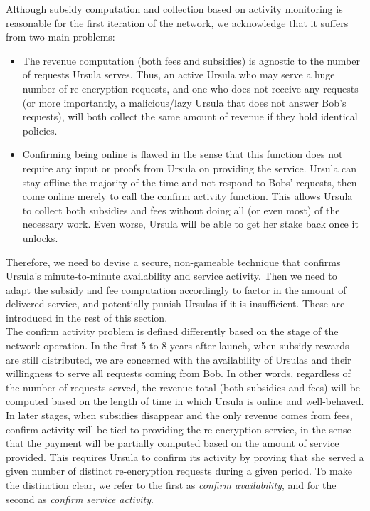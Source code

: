 \documentclass{llncs}
\begin{document}
Although subsidy computation and collection based on activity monitoring is reasonable for the first iteration of the network, we acknowledge that it suffers from two main problems:
\begin{itemize}
\setlength{\itemsep}{0pt}
\item The revenue computation (both fees and subsidies) is agnostic to the number of requests Ursula serves. Thus, an active Ursula who may serve a huge number of re-encryption requests, and one who does not receive any requests (or more importantly, a malicious/lazy Ursula that does not answer Bob's requests), will both collect the same amount of revenue if they hold identical policies.

\item Confirming being online is flawed in the sense that this function does not require any input or proofs from Ursula on providing the service. Ursula can stay offline the majority of the time and not respond to Bobs' requests, then come online merely to call the confirm activity function. This allows Ursula to collect both subsidies and fees without doing all (or even most) of the necessary work. Even worse, Ursula will be able to get her stake back once it unlocks.
\end{itemize}


Therefore, we need to devise a secure, non-gameable technique that confirms Ursula's minute-to-minute availability and service activity. Then we need to adapt the subsidy and fee computation accordingly to factor in the amount of delivered service, and potentially punish Ursulas if it is insufficient. These are introduced in the rest of this section. \\


 The confirm activity problem is defined differently based on the stage of the network operation. In the first 5 to 8 years after launch, when subsidy rewards are
still distributed, we are concerned with the availability of Ursulas and their willingness to
serve all requests coming from Bob. In other words, regardless of the number of requests served, the revenue total (both subsidies and fees) will be computed based on the length of time in which Ursula
is online and well-behaved. In later stages, when subsidies disappear
and the only revenue comes from fees, confirm activity will be tied to providing the re-encryption
service, in the sense that the payment will be partially computed based on the amount of
service provided. This requires Ursula to confirm its activity by proving that she served 
a given number of distinct re-encryption requests during a given period. To make the distinction 
clear, we refer to the first as \emph{confirm availability}, and for the second as \emph{confirm 
service activity}. \\
\end{document}
